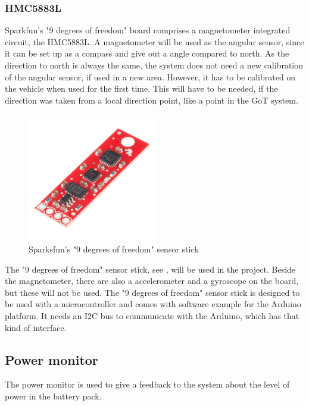\subsubsection{HMC5883L}
Sparkfun's "9 degrees of freedom" board comprises a magnetometer integrated circuit, the HMC5883L\cite{HMC5883L}. A magnetometer will be used as the angular sensor, since it can be set up as a compass and give out a angle compared to north. As the direction to north is always the same, the system does not need a new calibration of the angular sensor, if used in a new area. However, it has to be calibrated on the vehicle when used for the first time. This will have to be needed, if the direction was taken from a local direction point, like a point in the GoT system. 

\begin{figure}[H]
	\centering
	\includegraphics[width=0.50\textwidth]{figures/NineDegree.jpg}
		\caption{Sparksfun's "9 degrees of freedom" sensor stick} 
	\label{NineDegree}
\end{figure}

The "9 degrees of freedom" sensor stick, see , will be used in the project. Beside the magnetometer, there are also a accelerometer and a gyroscope on the board, but these will not be used. The "9 degrees of freedom" sensor stick is designed to be used with a microcontroller and comes with software example for the Arduino platform. It needs an I2C bus to communicate with the Arduino, which has that kind of interface.


\subsection{Power monitor}
The power monitor is used to give a feedback to the system about the level of power in the battery pack.

